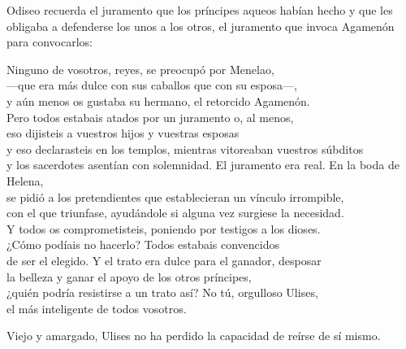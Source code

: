 Odiseo recuerda el juramento que los príncipes aqueos habían hecho y que les obligaba a defenderse los unos a los otros, el juramento que invoca Agamenón para convocarlos:
%
\begin{versopropio}
Ninguno de vosotros, reyes, se preocupó por Menelao,\\
---que era más dulce con sus caballos que con su esposa---,\\
y aún menos os gustaba su hermano, el retorcido Agamenón.\\
Pero todos estabais atados por un juramento o, al menos,\\
eso dijisteis a vuestros hijos y vuestras esposas\\
y eso declarasteis en los templos, mientras vitoreaban vuestros súbditos\\
y los sacerdotes asentían con solemnidad.
\stanzabreak
El juramento era real. En la boda de Helena,\\
se pidió a los pretendientes que establecieran un vínculo irrompible,\\
con el que triunfase, ayudándole si alguna vez surgiese la necesidad.\\
Y todos os comprometisteis, poniendo por testigos a los dioses.\\
¿Cómo podíais no hacerlo? Todos estabais convencidos\\
de ser el elegido. Y el trato era dulce para el ganador, desposar\\
la belleza y ganar el apoyo de los otros príncipes,\\
¿quién podría resistirse a un trato así? No tú, orgulloso Ulises,\\
el más inteligente de todos vosotros.
\end{versopropio}
%
Viejo y amargado, Ulises no ha perdido la capacidad de reírse de sí mismo.
%
